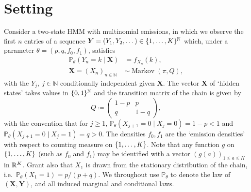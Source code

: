 \documentclass[journal]{IEEEtran}
\newcommand{\sgn}{\mathrm{sgn}}
\newcommand{\1}{\boldsymbol{1}}
\newcommand{\PP}{\mathbb{P}}
\DeclarePairedDelimiter{\braces}{\{}{\}}
\newcommand{\NN}{\mathbb{N}}
\begin{document}


	\section{Setting}
	\label{sec:setting}

	Consider a two-state HMM with multinomial emissions, in which we observe the first $n$ entries of a sequence $\bm{Y}=(Y_1,Y_2,\dots)\in \braces{1,\dots,K}^\NN$ which, under a parameter $\theta=(p,q,f_0,f_1)$, satisfies
	\begin{equation}\label{eqn:model}
		\begin{split}
			\PP_\theta (Y_n=k \mid \bm{X}) &= f_{X_n}(k),\\
			\bm{X}=(X_n)_{n\in \NN} &\sim \operatorname{Markov}(\pi,Q),
		\end{split}
	\end{equation}
	with the $Y_j,~j\in\NN$ conditionally independent given $\bm{X}$.
	The vector $\bm{X}$ of `hidden states' takes values in $\braces{0,1}^\NN$ and the transition matrix of the
	chain is given by
	\begin{equation}
		Q%
		\coloneqq%
		\begin{pmatrix}
			1 - p & p\\
			q & 1 - q
		\end{pmatrix}%
		,
	\end{equation}
	with the convention that for $j\geq 1$,
	$\PP_{\theta}(X_{j+1} = 0 \mid X_j = 0) = 1-p<1$ and
	$\PP_{\theta}(X_{j+1} = 0 \mid X_j = 1) = q>0$. The densities $f_0,f_1$ are the `emission densities' with respect to counting measure on $\braces{1,\dots,K}$.  Note that any function $g$ on $\braces{1,\dots,K}$ (such as $f_0$ and $f_1$)  may be identified with a vector $(g(a))_{1\leq a \leq K}$ in $\mathbb{R}^K$.
	 Grant also that
	$X_1$ is drawn from the stationary distribution of the chain, i.e.\
	$\PP_{\theta}(X_1 = 1) = p/(p + q)$. We throughout use $\PP_{\theta}$ to denote the law of $(\bm{X},\bm{Y})$, and all induced marginal and conditional laws.

	\smallskip
\end{document}
